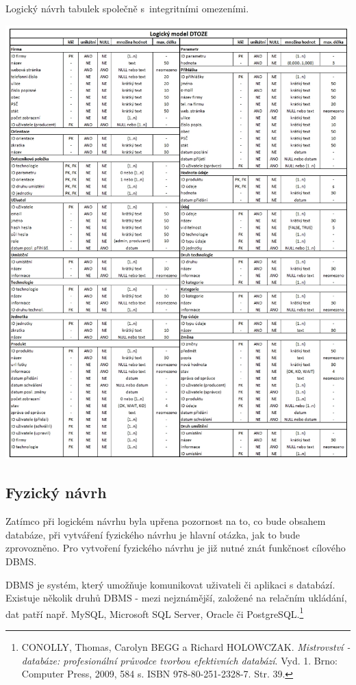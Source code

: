 \documentclass[11pt,a4paper]{article}
\begin{document}
\begin{table}[H] 
\centering 
\caption{Logický návrh tabulek společně s~integritními omezeními.} 
\includegraphics[scale=0.48]{DTOZE_log_D} 
\label{fig:DTOZE_log_D}
\end{table} 

\newpage

\subsection{Fyzický návrh}
Zatímco při logickém návrhu byla upřena pozornost na to, co bude obsahem databáze, při vytváření fyzického návrhu je hlavní otázka, jak to bude zprovozněno. Pro vytvoření fyzického návrhu je již nutné znát funkčnost cílového DBMS. 

DBMS je systém, který umožňuje komunikovat uživateli či aplikaci s databází. Existuje několik druhů DBMS - mezi nejznámější, založené na relačním ukládání, dat patří např. MySQL, Microsoft SQL Server, Oracle či PostgreSQL.\footnote{CONOLLY, Thomas, Carolyn BEGG a Richard HOLOWCZAK. \textit{Mistrovství - databáze: profesionální průvodce tvorbou efektivních databází}. Vyd. 1. Brno: Computer Press, 2009, 584 s. ISBN 978-80-251-2328-7. Str. 39.}
\end{document}

